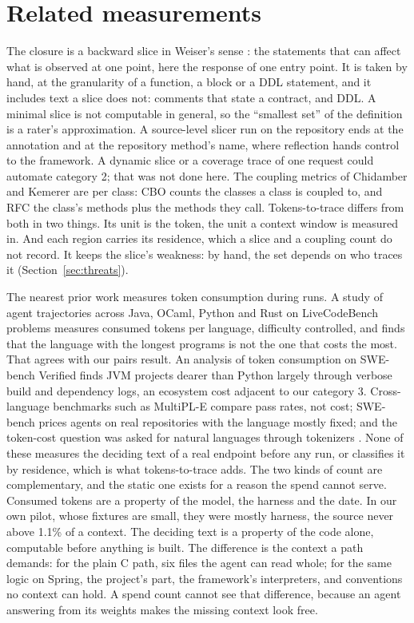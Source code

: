 \documentclass[journal]{IEEEtran}
\begin{document}
\section{Related measurements}

The closure is a backward slice in Weiser's sense \cite{weiser}: the
statements that can affect what is observed at one point, here the
response of one entry point. It is taken by hand, at the granularity of
a function, a block or a DDL statement, and it includes text a slice
does not: comments that state a contract, and DDL. A minimal slice is
not computable in general, so the ``smallest set'' of the definition is
a rater's approximation. A source-level slicer run on the repository
ends at the annotation and at the repository method's name, where
reflection hands control to the framework. A dynamic slice or a
coverage trace of one request could automate category 2; that was not
done here. The coupling metrics
of Chidamber and Kemerer \cite{ck} are per class: CBO counts the
classes a class is coupled to, and RFC the class's methods plus the
methods they call. Tokens-to-trace
differs from both in two things. Its unit is the token, the unit a
context window is measured in. And each region carries its residence,
which a slice and a coupling count do not record. It keeps the slice's
weakness: by hand, the set depends on who traces it
(Section~\ref{sec:threats}).

The nearest prior work measures token consumption during runs. A study of
agent trajectories across Java, OCaml, Python and Rust on LiveCodeBench
problems \cite{tokenmax} measures consumed tokens per language, difficulty
controlled, and finds that the language with the longest programs is not
the one that costs the most. That agrees with our pairs result. An
analysis of token consumption on SWE-bench Verified \cite{spend} finds JVM
projects dearer than Python largely through verbose build and dependency
logs, an ecosystem cost adjacent to our category 3. Cross-language
benchmarks such as MultiPL-E \cite{multiple} compare pass rates, not cost;
SWE-bench \cite{swebench} prices agents on real repositories with the
language mostly fixed; and the token-cost question was asked for natural
languages through tokenizers \cite{petrov}. None of these measures the
deciding text of a real endpoint before any run, or classifies it by
residence, which is what tokens-to-trace adds. The two kinds of count are
complementary, and the static one exists for a reason the spend cannot
serve. Consumed tokens are a property of the model, the harness and the
date. In our own pilot, whose fixtures are small, they were mostly
harness, the source never above 1.1\% of a context. The deciding text is a property of the code
alone, computable before anything is built. The difference is the
context a path demands: for the plain C path, six files the
agent can read whole; for the same logic on Spring, the project's part,
the framework's interpreters, and conventions no context can hold. A
spend count cannot see that difference, because an agent answering from
its weights makes the missing context look free.
\end{document}

